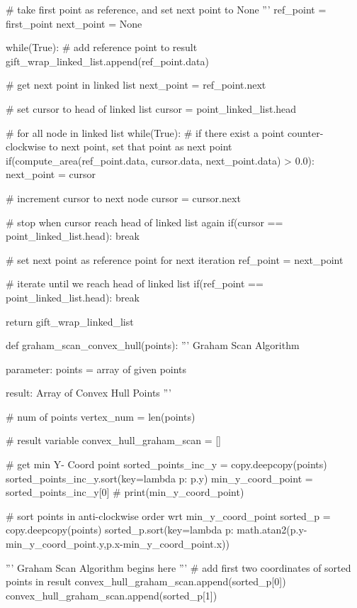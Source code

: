 \documentclass[a4paper,12pt]{article}
\begin{document}
\begin{spacing}{1}
\begin{footnotesize}
\begin{spverbatim}
    # take first point as reference, and set next point to None '''
    ref_point = first_point
    next_point = None

    while(True):
        # add reference point to result
        gift_wrap_linked_list.append(ref_point.data)

        # get next point in linked list
        next_point = ref_point.next

        # set cursor to head of linked list
        cursor = point_linked_list.head

        # for all node in linked list
        while(True):
            # if there exist a point counter-clockwise to next point, set that point as next point
            if(compute_area(ref_point.data, cursor.data, next_point.data) > 0.0):
                next_point = cursor

            # increment cursor to next node
            cursor = cursor.next

            # stop when cursor reach head of linked list again
            if(cursor == point_linked_list.head):
                break

        # set next point as reference point for next iteration
        ref_point = next_point

        # iterate until we reach head of linked list
        if(ref_point == point_linked_list.head):
            break

    return gift_wrap_linked_list

def graham_scan_convex_hull(points):
    ''' Graham Scan Algorithm

        parameter: points = array of given points

        result: Array of Convex Hull Points
    '''

    # num of points
    vertex_num = len(points)

    # result variable
    convex_hull_graham_scan = []

    # get min Y- Coord point
    sorted_points_inc_y = copy.deepcopy(points)
    sorted_points_inc_y.sort(key=lambda p: p.y)
    min_y_coord_point = sorted_points_inc_y[0]
    # print(min_y_coord_point)

    # sort points in anti-clockwise order wrt min_y_coord_point
    sorted_p = copy.deepcopy(points)
    sorted_p.sort(key=lambda p: math.atan2(p.y-min_y_coord_point.y,p.x-min_y_coord_point.x))

    ''' Graham Scan Algorithm begins here '''
    # add first two coordinates of sorted points in result
    convex_hull_graham_scan.append(sorted_p[0])
    convex_hull_graham_scan.append(sorted_p[1])


\end{spverbatim}
\end{footnotesize}
\end{spacing}
\end{document}
